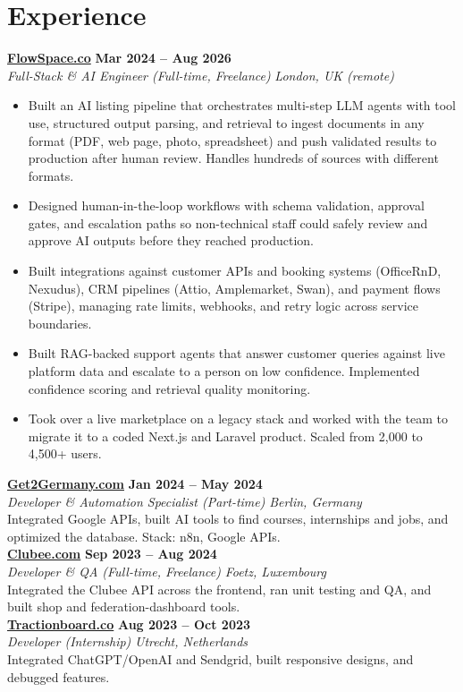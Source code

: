 \documentclass[a4paper,10pt]{article}
\newcommand{\role}[4]{%
 \textbf{#1} \hfill \textbf{#2}\\[1pt]%
 \textit{#3} \hfill \textit{#4}\\[2pt]%
}
\begin{document}
\section{Experience}

\role{\href{https://flowspace.co}{FlowSpace.co}}{Mar 2024 -- Aug 2026}{Full-Stack \& AI Engineer (Full-time, Freelance)}{London, UK (remote)}
\begin{itemize}
 \item Built an AI listing pipeline that orchestrates multi-step LLM agents with tool use, structured output parsing, and retrieval to ingest documents in any format (PDF, web page, photo, spreadsheet) and push validated results to production after human review. Handles hundreds of sources with different formats.
 \item Designed human-in-the-loop workflows with schema validation, approval gates, and escalation paths so non-technical staff could safely review and approve AI outputs before they reached production.
 \item Built integrations against customer APIs and booking systems (OfficeRnD, Nexudus), CRM pipelines (Attio, Amplemarket, Swan), and payment flows (Stripe), managing rate limits, webhooks, and retry logic across service boundaries.
 \item Built RAG-backed support agents that answer customer queries against live platform data and escalate to a person on low confidence. Implemented confidence scoring and retrieval quality monitoring.
 \item Took over a live marketplace on a legacy stack and worked with the team to migrate it to a coded Next.js and Laravel product. Scaled from 2,000 to 4,500+ users.
\end{itemize}

\role{\href{https://get2germany.com}{Get2Germany.com}}{Jan 2024 -- May 2024}{Developer \& Automation Specialist (Part-time)}{Berlin, Germany}
Integrated Google APIs, built AI tools to find courses, internships and jobs, and optimized the database. Stack: n8n, Google APIs.\\[1pt]

\role{\href{https://clubee.com}{Clubee.com}}{Sep 2023 -- Aug 2024}{Developer \& QA (Full-time, Freelance)}{Foetz, Luxembourg}
Integrated the Clubee API across the frontend, ran unit testing and QA, and built shop and federation-dashboard tools.\\[1pt]

\role{\href{https://tractionboard.co}{Tractionboard.co}}{Aug 2023 -- Oct 2023}{Developer (Internship)}{Utrecht, Netherlands}
Integrated ChatGPT/OpenAI and Sendgrid, built responsive designs, and debugged features.
\end{document}
